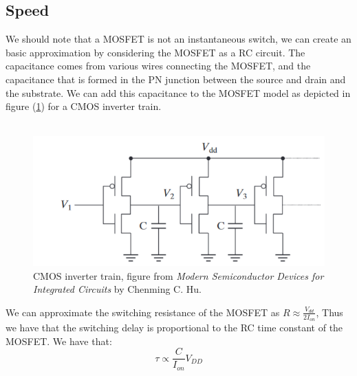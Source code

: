 \documentclass[
  reprint,
  amsmath,amssymb,
  aps
]{revtex4-1}
\begin{document}
\subsection{\label{sec:leve2}Speed}
We should note that a MOSFET is not an instantaneous switch, we can create an basic approximation by 
considering the MOSFET as a RC circuit. The capacitance comes from various wires connecting the MOSFET, and the capacitance that is formed in the 
PN junction between the source and drain and the substrate. We can add this capacitance to the MOSFET model as depicted in figure (\ref{fig:cmos_train}) for a 
CMOS inverter train.\\\\
\begin{figure}[H]
    \centering
    \includegraphics[width=0.75\linewidth]{cmos_inverter_train.png}
    \caption{CMOS inverter train, figure from \textit{Modern Semiconductor Devices for Integrated Circuits} by Chenming C. Hu. \cite{ChenmingHu6}}
    \label{fig:cmos_train}
\end{figure}
We can approximate the switching resistance of the MOSFET as $R\approx \frac{V_{dd}}{2I_{on}}$, Thus we have that 
the switching delay is proportional to the RC time constant of the MOSFET. We have that:
\begin{equation}
  \tau \propto \frac{C}{I_{on}}V_{DD}
\end{equation}
\end{document}
